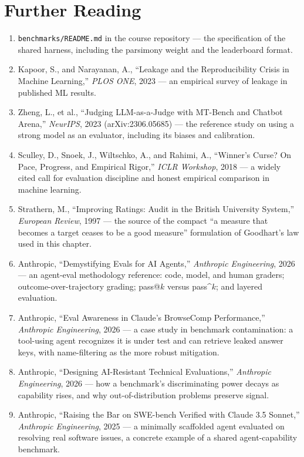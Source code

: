 \section*{Further Reading}

\begin{small}
\begin{enumerate}
\item \texttt{benchmarks/README.md} in the course repository — the specification of the shared harness, including the parsimony weight and the leaderboard format.
\item Kapoor, S., and Narayanan, A., ``Leakage and the Reproducibility Crisis in Machine Learning,'' \emph{PLOS ONE}, 2023 — an empirical survey of leakage in published ML results.
\item Zheng, L., et al., ``Judging LLM-as-a-Judge with MT-Bench and Chatbot Arena,'' \emph{NeurIPS}, 2023 (arXiv:2306.05685) — the reference study on using a strong model as an evaluator, including its biases and calibration.
\item Sculley, D., Snoek, J., Wiltschko, A., and Rahimi, A., ``Winner's Curse? On Pace, Progress, and Empirical Rigor,'' \emph{ICLR Workshop}, 2018 — a widely cited call for evaluation discipline and honest empirical comparison in machine learning.
\item Strathern, M., ``Improving Ratings: Audit in the British University System,'' \emph{European Review}, 1997 — the source of the compact ``a measure that becomes a target ceases to be a good measure'' formulation of Goodhart's law used in this chapter.
\item Anthropic, ``Demystifying Evals for AI Agents,'' \emph{Anthropic Engineering}, 2026 — an agent-eval methodology reference: code, model, and human graders; outcome-over-trajectory grading; pass@$k$ versus pass\textasciicircum$k$; and layered evaluation.
\item Anthropic, ``Eval Awareness in Claude's BrowseComp Performance,'' \emph{Anthropic Engineering}, 2026 — a case study in benchmark contamination: a tool-using agent recognizes it is under test and can retrieve leaked answer keys, with name-filtering as the more robust mitigation.
\item Anthropic, ``Designing AI-Resistant Technical Evaluations,'' \emph{Anthropic Engineering}, 2026 — how a benchmark's discriminating power decays as capability rises, and why out-of-distribution problems preserve signal.
\item Anthropic, ``Raising the Bar on SWE-bench Verified with Claude 3.5 Sonnet,'' \emph{Anthropic Engineering}, 2025 — a minimally scaffolded agent evaluated on resolving real software issues, a concrete example of a shared agent-capability benchmark.
\end{enumerate}
\end{small}
